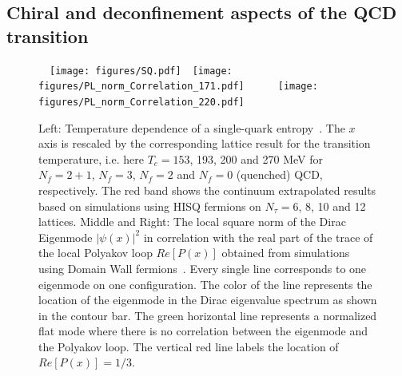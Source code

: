 \documentclass{PoS}
\begin{document}
\subsection{Chiral and deconfinement aspects of the QCD transition }
\label{sec:connection}
\begin{figure}[htp]
\begin{center}

~~\texttt{[image: figures/SQ.pdf]}~~\texttt{[image: figures/PL\_norm\_Correlation\_171.pdf]}~~~~~~\texttt{[image: figures/PL\_norm\_Correlation\_220.pdf]}~\\
\end{center}
\caption{Left: Temperature dependence of a single-quark entropy~\cite{Bazavov:2016uvm}. The $x$ axis is rescaled by the corresponding lattice result for the transition temperature, i.e. here $T_c=153$, 193, 200 and 270 MeV for $N_f=2+1$, $N_f=3$, $N_f=2$ and $N_f=0$ (quenched) QCD, respectively. The red band shows the continuum extrapolated results based on simulations using HISQ fermions on $N_\tau=6$, 8, 10 and 12 lattices.  Middle and Right: The local square norm of the Dirac Eigenmode $|\psi(x)|^2$ in correlation with the real part of the trace of the local Polyakov loop $Re[P(x)]$ obtained from simulations using Domain Wall fermions~\cite{Cossu:2016scb}. Every single line corresponds to one eigenmode on one configuration. The color of the line represents the location of the eigenmode in the Dirac eigenvalue spectrum as shown in the contour bar. The green horizontal line represents a normalized flat mode where there is no correlation between the eigenmode and  the Polyakov loop. The vertical red line labels the location of $Re[P(x)]=1/3$.}
\label{fig:transitions}
\end{figure}
\end{document}
